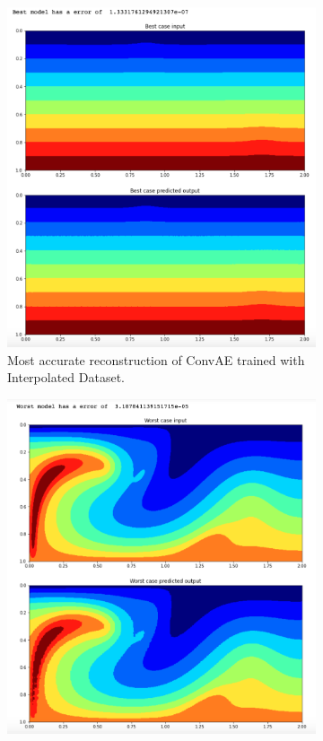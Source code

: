 \begin{figure}[H]
\centering
\begin{subfigure}{0.45\textwidth}
    \includegraphics[width=\textwidth]{figures/mantle_convection_images/larger_dataset_interpolated/ConvAE_Best.png}
    \caption{Most accurate reconstruction of ConvAE trained with Interpolated Dataset.}
\end{subfigure}
\hfill
\begin{subfigure}{0.45\textwidth}
    \includegraphics[width=\textwidth]{figures/mantle_convection_images/larger_dataset_interpolated/ConvAE_Worst.png}

\end{subfigure}
\end{figure}
